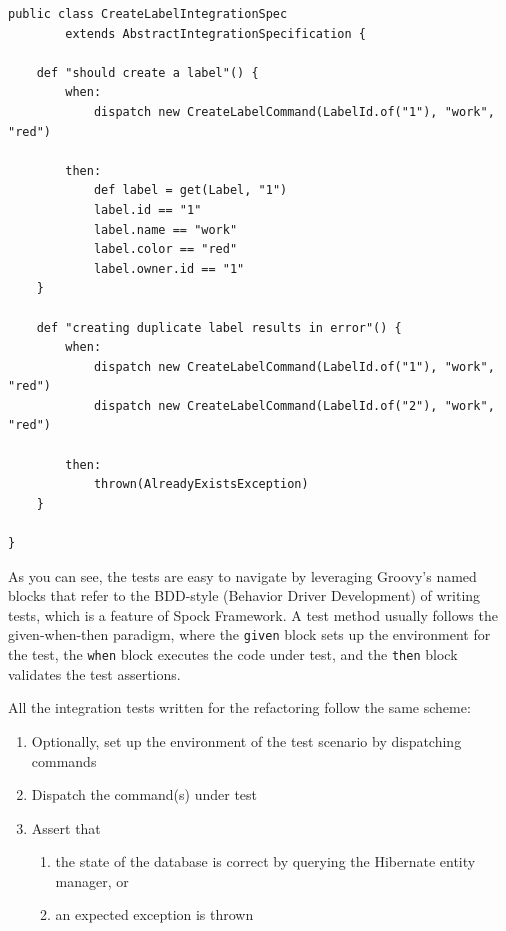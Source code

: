 \documentclass{book}
\begin{document}
\begin{lstlisting}[caption={An example of a test specification using Spock.
The first method tests successful creation of a new label.
The second method tests that creating a duplicate label throws an exception.},label={lst:test},captionpos=b,float,floatplacement=H]
public class CreateLabelIntegrationSpec 
        extends AbstractIntegrationSpecification {

    def "should create a label"() {
        when:
            dispatch new CreateLabelCommand(LabelId.of("1"), "work", "red")

        then:
            def label = get(Label, "1")
            label.id == "1"
            label.name == "work"
            label.color == "red"
            label.owner.id == "1"
    }

    def "creating duplicate label results in error"() {
        when:
            dispatch new CreateLabelCommand(LabelId.of("1"), "work", "red")
            dispatch new CreateLabelCommand(LabelId.of("2"), "work", "red")

        then:
            thrown(AlreadyExistsException)
    }

}
\end{lstlisting}

As you can see, the tests are easy to navigate by leveraging Groovy's
named blocks that refer to the BDD-style (Behavior Driver Development)
of writing tests, which is a feature of Spock Framework. A test method
usually follows the given-when-then paradigm, where the \texttt{given}
block sets up the environment for the test, the \texttt{when} block
executes the code under test, and the \texttt{then} block validates the
test assertions.

All the integration tests written for the refactoring follow the same
scheme:

\begin{enumerate}
\def\labelenumi{\arabic{enumi}.}
\tightlist
\item
  Optionally, set up the environment of the test scenario by dispatching
  commands
\item
  Dispatch the command(s) under test
\item
  Assert that

  \begin{enumerate}
  \def\labelenumii{\alph{enumii})}
  \tightlist
  \item
    the state of the database is correct by querying the Hibernate
    entity manager, or
  \item
    an expected exception is thrown
  \end{enumerate}
\end{enumerate}
\end{document}
